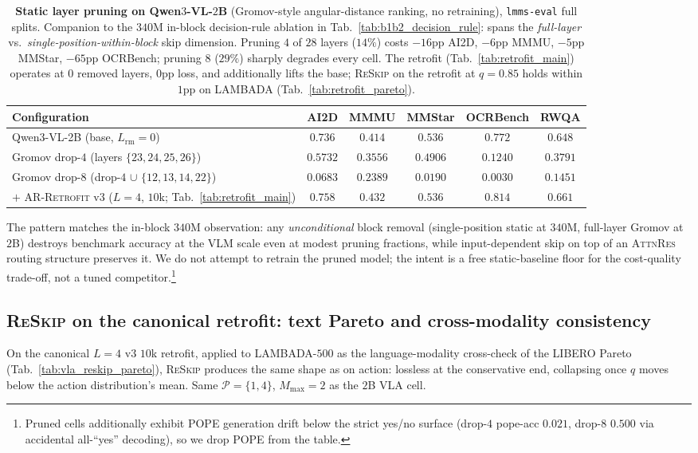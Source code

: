 \documentclass{article}
\newcommand{\attnres}{\textsc{AttnRes}}
\newcommand{\reskip}{\textsc{ReSkip}}
\newcommand{\retrofit}{\textsc{AR-Retrofit}}
\begin{document}
\begin{table}[h]
\caption{\textbf{Static layer pruning on Qwen$3$-VL-$2$B} (Gromov-style angular-distance ranking, no retraining), \texttt{lmms-eval} full splits. Companion to the $340$M in-block decision-rule ablation in Tab.~\ref{tab:b1b2_decision_rule}: spans the \emph{full-layer} vs.\ \emph{single-position-within-block} skip dimension. Pruning $4$ of $28$ layers ($14\%$) costs $-16$pp AI2D, $-6$pp MMMU, $-5$pp MMStar, $-65$pp OCRBench; pruning $8$ ($29\%$) sharply degrades every cell. The retrofit (Tab.~\ref{tab:retrofit_main}) operates at $0$ removed layers, $0$pp loss, and additionally lifts the base; \reskip{} on the retrofit at $q{=}0.85$ holds within $1$pp on LAMBADA (Tab.~\ref{tab:retrofit_pareto}).}
\label{tab:gromov_pruning_2b}
\centering\small
\setlength{\tabcolsep}{4pt}
\begin{tabular}{lccccc}
\toprule
Configuration & AI2D & MMMU & MMStar & OCRBench & RWQA \\
\midrule
Qwen3-VL-2B (base, $L_{\text{rm}}{=}0$)            & $0.736$ & $0.414$ & $0.536$ & $0.772$ & $0.648$ \\
Gromov drop-$4$ (layers $\{23,24,25,26\}$)         & $0.5732$ & $0.3556$ & $0.4906$ & $0.1240$ & $0.3791$ \\
Gromov drop-$8$ (drop-$4$ $\cup$ $\{12,13,14,22\}$) & $0.0683$ & $0.2389$ & $0.0190$ & $0.0030$ & $0.1451$ \\
\midrule
$+$ \retrofit{} v3 ($L{=}4$, $10$k; Tab.~\ref{tab:retrofit_main}) & $\mathbf{0.758}$ & $\mathbf{0.432}$ & $\mathbf{0.536}$ & $\mathbf{0.814}$ & $\mathbf{0.661}$ \\
\bottomrule
\end{tabular}
\end{table}

The pattern matches the in-block $340$M observation: any
\emph{unconditional} block removal (single-position static at
$340$M, full-layer Gromov at $2$B) destroys benchmark accuracy at
the VLM scale even at modest pruning fractions, while
input-dependent skip on top of an \attnres{} routing structure
preserves it. We do not attempt to retrain the pruned model; the
intent is a free static-baseline floor for the cost-quality
trade-off, not a tuned competitor.\footnote{Pruned cells additionally
exhibit POPE generation drift below the strict yes/no surface
(drop-$4$ pope-acc $0.021$, drop-$8$ $0.500$ via accidental
all-``yes'' decoding), so we drop POPE from the table.}

\subsection{\reskip{} on the canonical retrofit: text Pareto and cross-modality consistency}
\label{app:retrofit_pareto}
On the canonical $L{=}4$ v3 $10$k retrofit, applied to LAMBADA-$500$ as the language-modality cross-check of the LIBERO Pareto (Tab.~\ref{tab:vla_reskip_pareto}), \reskip{} produces the same shape as on action: lossless at the conservative end, collapsing once $q$ moves below the action distribution's mean. Same $\mathcal{P}{=}\{1,4\}$, $M_{\max}{=}2$ as the $2$B VLA cell.
\end{document}
